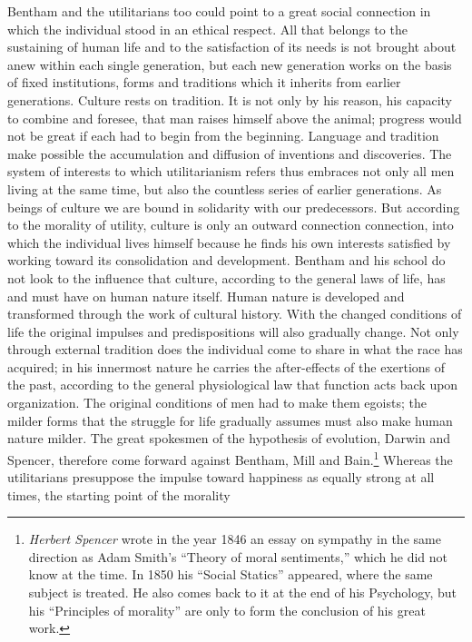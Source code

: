 \documentclass[12pt,a4paper,openany]{book}
\newcommand{\opage}[1]{\marginnote{\footnotesize\textit{[#1]}}}
\begin{document}
Bentham and the utilitarians too could point to a great social connection in
which the individual stood in an ethical respect. All that belongs to the
sustaining of human life and to the satisfaction of its needs is not brought
about anew within each single generation, but each new generation works on the
basis of fixed institutions, forms and traditions which it inherits from
earlier generations. Culture rests on tradition. It is not only by his reason,
his capacity to combine and foresee, that man raises himself above the animal;
progress would not be great if each had to begin from the beginning. Language
and tradition make possible the accumulation and diffusion of inventions and
discoveries. The system of interests to which utilitarianism refers thus
embraces not only all men living at the same time, but also the countless
series of earlier generations. As beings of culture we are bound in solidarity
with our predecessors. But according to the morality of utility, culture is
only an outward connection
\opage{37}connection, into which the individual lives himself because he finds
his own interests satisfied by working toward its consolidation and
development. Bentham and his school do not look to the influence that culture,
according to the general laws of life, has and must have on human nature
itself. Human nature is developed and transformed through the work of cultural
history. With the changed conditions of life the original impulses and
predispositions will also gradually change. Not only through external
tradition does the individual come to share in what the race has acquired; in
his innermost nature he carries the after-effects of the exertions of the
past, according to the general physiological law that function acts back upon
organization. The original conditions of men had to make them egoists; the
milder forms that the struggle for life gradually assumes must also make human
nature milder. The great spokesmen of the hypothesis of evolution, Darwin and
Spencer, therefore come forward against Bentham, Mill and
Bain.\footnote[1]{\emph{Herbert Spencer} wrote in the year 1846 an essay on
sympathy in the same direction as Adam Smith's ``Theory of moral sentiments,''
which he did not know at the time. In 1850 his ``Social Statics'' appeared,
where the same subject is treated. He also comes back to it at the end of his
Psychology, but his ``Principles of morality'' are only to form the conclusion
of his great work.} Whereas the utilitarians presuppose the impulse toward
happiness as equally strong at all times, the starting point of the morality
\end{document}

